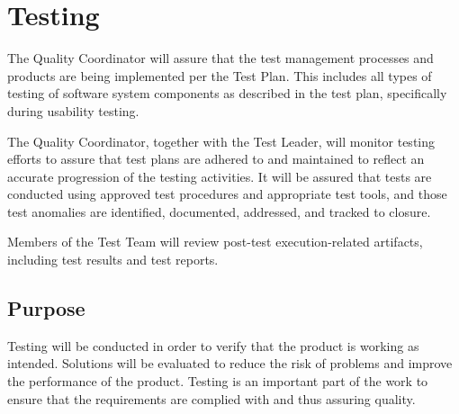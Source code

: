 \section{Testing}
\label{sec:testing}

The Quality Coordinator will assure that the test management processes and products are being implemented per the Test Plan. This includes all types of testing of software system components as described in the test plan, specifically during usability testing.

The Quality Coordinator, together with the Test Leader, will monitor testing efforts to assure that test plans are adhered to and maintained to reflect an accurate progression of the testing activities. It will be assured that tests are conducted using approved test procedures and appropriate test tools, and those test anomalies are identified, documented, addressed, and tracked to closure.

Members of the Test Team will review post-test execution-related artifacts, including test results and test reports.

\subsection{Purpose}
Testing will be conducted in order to verify that the product is working as intended. Solutions will be evaluated to reduce the risk of problems and improve the performance of the product. Testing is an important part of the work to ensure that the requirements are complied with and thus assuring quality.

